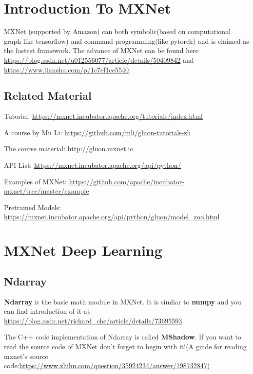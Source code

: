 \documentclass[english]{../TeXTemplate/pkupaper}
\title{\titlemark}
\author{Yiping Lu}
\date{Updated on May 12}
\begin{document}
\maketitle
\section{Introduction To MXNet}


MXNet (supported by Amazon) can both symbolic(based on computational graph like tensorflow) and command programming(like pytorch) and is claimed as the fastest framework. The advance of MXNet can be found here \url{https://blog.csdn.net/u012556077/article/details/50409842} and \url{https://www.jianshu.com/p/1c7ef1ce5540}.


\subsection{Related Material}



Tutorial: \url{https://mxnet.incubator.apache.org/tutorials/index.html}

A course by Mu Li: \url{https://github.com/mli/gluon-tutorials-zh}

The course material: \url{http://gluon.mxnet.io}

API List:
\url{https://mxnet.incubator.apache.org/api/python/}

Examples of MXNet: \url{https://github.com/apache/incubator-mxnet/tree/master/example}

Pretrained Models: \url{https://mxnet.incubator.apache.org/api/python/gluon/model_zoo.html}

\section{MXNet Deep Learning}

\subsection{Ndarray}

\textbf{Ndarray} is the basic math module in MXNet. It is simliar to \textbf{numpy} and you can find introduction of it at \url{https://blog.csdn.net/richard_che/article/details/73695593}.

The C++ code implementation of Ndarray is called \textbf{MShadow}. If you want to read the source code of MXNet don't forget to begin with it!(A guide for reading mxnet's source code:\url{https://www.zhihu.com/question/35924234/answer/198732847})
\end{document}
